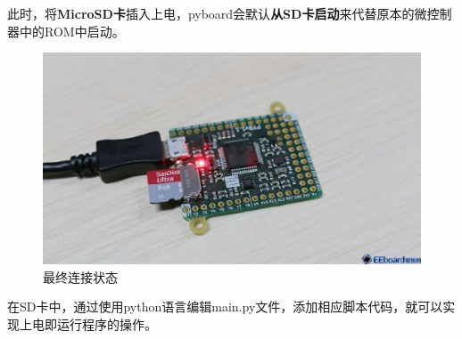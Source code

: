 \begin{enumerate}[(1)]
      此时，将{\bf{MicroSD卡}}插入上电，pyboard会默认{\bf{从SD卡启动}}来代替原本的微控制器中的ROM中启动。

      \begin{figure}[H]
      \centering
      \includegraphics[width=12cm]{3_sd.jpg}
      \caption{最终连接状态}
      \label{最终连接状态}
      \end{figure}

      在SD卡中，通过使用python语言编辑main.py文件，添加相应脚本代码，就可以实现上电即运行程序的操作。
\end{enumerate}


